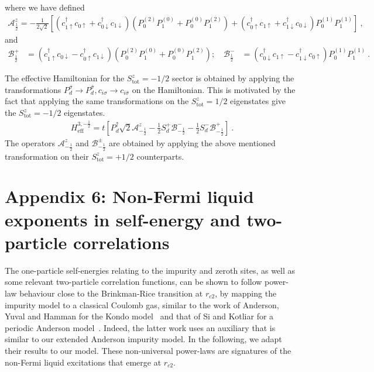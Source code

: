 where we have defined
\begin{eqnarray}
	\mathcal{A}^z_\frac{1}{2} = -\frac{1}{2\sqrt 2}\left[\left(c^\dagger_{1 \uparrow} c_{0 \uparrow} + c^\dagger_{0 \downarrow} c_{1 \downarrow}\right)\left( P_0^{(2)} P_1^{(0)} + P_0^{(0)} P_1^{(2)}\right) + \left(c^\dagger_{0 \uparrow} c_{1 \uparrow} + c^\dagger_{1 \downarrow} c_{0 \downarrow}\right) P_0^{(1)} P_1^{(1)}\right]~,
\end{eqnarray}
and
\begin{eqnarray}
	\mathcal{B}^+_\frac{1}{2} &= \left(c^\dagger_{1 \uparrow}c_{0 \downarrow} - c^\dagger_{0 \uparrow} c_{1 \downarrow} \right)\left( P_0^{(2)} P_1^{(0)} + P_0^{(0)} P_1^{(2)}\right); \quad\mathcal{B}^-_\frac{1}{2} &= \left(c^\dagger_{0 \downarrow}c_{1 \uparrow} - c^\dagger_{1 \downarrow} c_{0 \uparrow} \right) P_0^{(1)} P_1^{(1)}~.
\end{eqnarray}

The effective Hamiltonian for the \(S_\text{tot}^z = -1/2\) sector is obtained by applying the transformations \(P_d^\sigma \to P_d^{\bar\sigma}, c_{i\sigma} \to c_{i\bar\sigma}\) on the Hamiltonian. This is motivated by the fact that applying the same transformations on the \(S_\text{tot}^z = 1/2\) eigenstates give the \(S_\text{tot}^z = -1/2\) eigenstates.
\begin{eqnarray}
	H_\text{eff}^{3,-\frac{1}{2}} = t\left[P_d^{ \uparrow} \sqrt 2\mathcal{A}^z_{-\frac{1}{2}} - \frac{1}{2}S_d^+ \mathcal{B}^-_{-\frac{1}{2}} - \frac{1}{2}S_d^- \mathcal{B}^+_{-\frac{1}{2}}\right] ~.
\end{eqnarray}
The operators \(\mathcal{A}^z_{-\frac{1}{2}}\) and \(\mathcal{B}^\pm_{-\frac{1}{2}}\) are obtained by applying the above mentioned transformation on their \(S^z_\text{tot} = +1/2\) counterparts.

\section*{Appendix 6: Non-Fermi liquid exponents in self-energy and two-particle correlations}
The one-particle self-energies relating to the impurity and zeroth sites, as well as some relevant two-particle correlation functions, can be shown to follow power-law behaviour close to the Brinkman-Rice transition at \(r_{c2}\), by mapping the impurity model to a classical Coulomb gas, similar to the work of Anderson, Yuval and Hamman for the Kondo model~\cite{anderson1969exact} and that of Si and Kotliar for a periodic Anderson model~\cite{si_kotliar_1993}. Indeed, the latter work uses an auxiliary that is similar to our extended Anderson impurity model. In the following, we adapt their results to our model. These non-universal power-laws are signatures of the non-Fermi liquid excitations that emerge at \(r_{c2}\).

